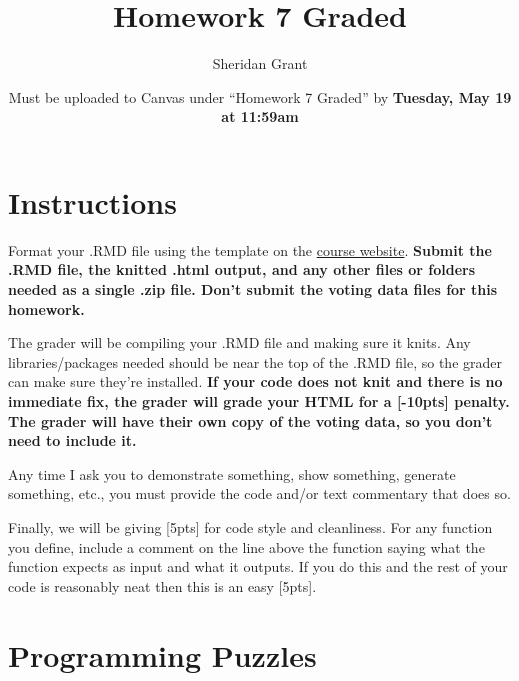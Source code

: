 \documentclass[12pt]{article}
\title{Homework 7 Graded}
\author{Sheridan Grant}
\date{Must be uploaded to Canvas under ``Homework 7 Graded'' by \textbf{Tuesday, May 19 at 11:59am}}
\begin{document}
\sloppy

\maketitle

\section*{Instructions}

Format your .RMD file using the template on the \href{https://sheridanlgrant.github.io/teaching/STAT302_SPR2020}{course website}. \textbf{Submit the .RMD file, the knitted .html output, and any other files or folders needed as a single .zip file. Don't submit the voting data files for this homework.}

The grader will be compiling your .RMD file and making sure it knits. Any libraries/packages needed should be near the top of the .RMD file, so the grader can make sure they're installed. \textbf{If your code does not knit and there is no immediate fix, the grader will grade your HTML for a [-10pts] penalty. The grader will have their own copy of the voting data, so you don't need to include it.}

Any time I ask you to demonstrate something, show something, generate something, etc., you must provide the code and/or text commentary that does so.

Finally, we will be giving [5pts] for code style and cleanliness. For any function you define, include a comment on the line above the function saying what the function expects as input and what it outputs. If you do this and the rest of your code is reasonably neat then this is an easy [5pts].

\section{Programming Puzzles}
\end{document}
